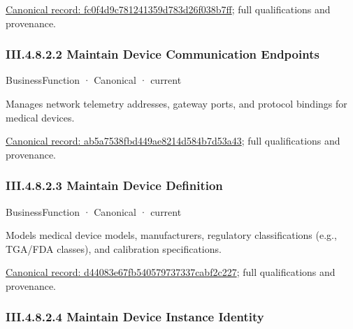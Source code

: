 {\footnotesize \href{../../../../continuum/business/business-function/fc0f4d9c781241359d783d26f038b7ff.md}{Canonical record: fc0f4d9c781241359d783d26f038b7ff}; full qualifications and provenance.}\par
\subsubsection*{III.4.8.2.2 Maintain Device Communication Endpoints}
\label{navigation:III.4.8.2.2}

\label{element:ab5a7538fbd449ae8214d584b7d53a43}
{\small BusinessFunction · Canonical · current}\par

Manages network telemetry addresses, gateway ports, and protocol bindings for medical devices.


{\footnotesize \href{../../../../continuum/business/business-function/ab5a7538fbd449ae8214d584b7d53a43.md}{Canonical record: ab5a7538fbd449ae8214d584b7d53a43}; full qualifications and provenance.}\par
\subsubsection*{III.4.8.2.3 Maintain Device Definition}
\label{navigation:III.4.8.2.3}

\label{element:d44083e67fb540579737337cabf2c227}
{\small BusinessFunction · Canonical · current}\par

Models medical device models, manufacturers, regulatory classifications (e.g., TGA/FDA classes), and calibration specifications.


{\footnotesize \href{../../../../continuum/business/business-function/d44083e67fb540579737337cabf2c227.md}{Canonical record: d44083e67fb540579737337cabf2c227}; full qualifications and provenance.}\par
\subsubsection*{III.4.8.2.4 Maintain Device Instance Identity}
\label{navigation:III.4.8.2.4}

